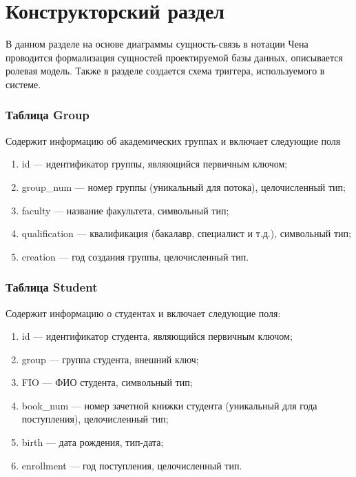 \chapter{Конструкторский раздел}

В данном разделе на основе диаграммы сущность-связь в нотации Чена проводится формализация сущностей проектируемой базы данных, описывается ролевая модель. Также в разделе создается схема триггера, используемого в системе.

%
%

\subsection*{Таблица Group}

Содержит информацию об академических группах и включает следующие поля

\begin{enumerate}
	\item id --- идентификатор группы, являющийся первичным ключом;
	\item group\_num --- номер группы (уникальный для потока), целочисленный тип;
	\item faculty --- название факультета, символьный тип;
	\item qualification --- квалификация (бакалавр, специалист и т.д.), символьный тип;
	\item creation --- год создания группы, целочисленный тип.
\end{enumerate}


\subsection*{Таблица Student}

Содержит информацию о студентах и включает следующие поля:

\begin{enumerate}
	\item id --- идентификатор студента, являющийся первичным ключом;
	\item group --- группа студента, внешний ключ;
	\item FIO --- ФИО студента, символьный тип;
	\item book\_num --- номер зачетной книжки студента (уникальный для года поступления), целочисленный тип;
	\item birth --- дата рождения, тип-дата;
	\item enrollment --- год поступления, целочисленный тип.
\end{enumerate}

